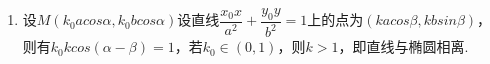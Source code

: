 \begin{enumerate}
\begin{jieda}
\begin{enumerate}
            $A$处切线方程为$\dfrac{x_1x}{a^2}+\dfrac{y_1y}{b^2} = 1$，$B$处切线方程为$\dfrac{x_2x}{a^2}+\dfrac{y_2y}{b^2} = 1$，两者交点为$M(x_0, y_0)$，因此有$\left\{\begin{array}{l}
                 \dfrac{x_0x_1}{a^2}+\dfrac{y_0y_1}{b^2} = 1 \\
                 \dfrac{x_0x_2}{a^2}+\dfrac{y_0y_2}{b^2} = 1
            \end{array}\right.$，故$A,B$两点坐标均满足方程$\dfrac{x_0x}{a^2}+\dfrac{y_0y}{b^2} = 1$，因此切点弦$AB$的方程为$\dfrac{x_0x}{a^2}+\dfrac{y_0y}{b^2} = 1$
            \item 设$M(k_0acos\alpha, k_0bcos\alpha)$设直线$\dfrac{x_0x}{a^2}+\dfrac{y_0y}{b^2} = 1$上的点为$(kacos\beta, kbsin\beta)$，则有$k_0kcos(\alpha-\beta) = 1$，若$k_0\in(0, 1)$，则$k > 1$，即直线与椭圆相离.
            \end{enumerate}
    \end{jieda}
\end{enumerate}

